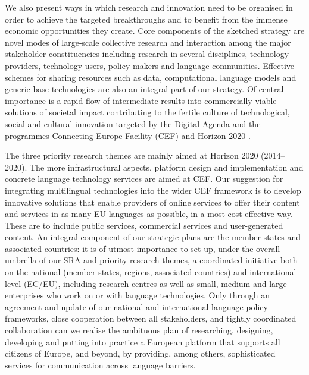 \documentclass[10pt, plain]{../../metanetpaper}
\begin{document}
\begin{multicols}{2}
We also present ways in which research and innovation need to be organised in order to achieve the targeted breakthroughs and to benefit from the immense economic opportunities they create. Core components of the sketched strategy are novel modes of large-scale collective research and interaction among the major stakeholder constituencies including research in several disciplines, technology providers, technology users, policy makers and language communities. Effective schemes for sharing resources such as data, computational language models and generic base technologies are also an integral part of our strategy. Of central importance is a rapid flow of intermediate results into commercially viable solutions of societal impact contributing to the fertile culture of technological, social and cultural innovation targeted by the Digital Agenda \cite{DA2010} and the programmes Connecting Europe Facility (CEF) \cite{CEF2011} and Horizon 2020 \cite{H2020}.

The three priority research themes are mainly aimed at Horizon 2020 (2014--2020). The more infrastructural aspects, platform design and implementation and concrete language technology services are aimed at CEF. Our suggestion for integrating multilingual technologies into the wider CEF framework is to develop innovative solutions that enable providers of online services to offer their content and services in as many EU languages as possible, in a most cost effective way. These are to include public services, commercial services and user-generated content. An integral component of our strategic plans are the member states and associated countries: it is of utmost importance to set up, under the overall umbrella of our SRA and priority research themes, a coordinated initiative both on the national (member states, regions, associated countries) and international level (EC/EU), including research centres as well as small, medium and large enterprises who work on or with language technologies. Only through an agreement and update of our national and international language policy frameworks, close cooperation between all stakeholders, and tightly coordinated collaboration can we realise the ambituous plan of researching, designing, developing and putting into practice a European platform \cite{bruegel12} that supports all citizens of Europe, and beyond, by providing, among others, sophisticated services for communication across language barriers.  
\end{multicols}

\clearpage
\end{document}
